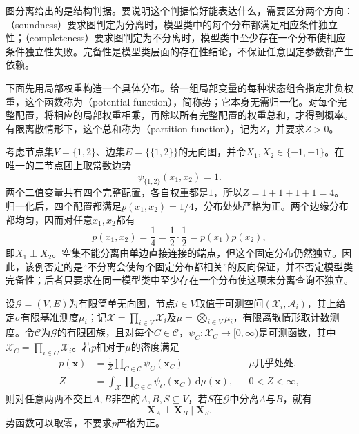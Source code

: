 图分离给出的是结构判据。要说明这个判据恰好能表达什么，需要区分两个方向：（soundness）要求图判定为分离时，模型类中的每个分布都满足相应条件独立性；（completeness）要求图判定为不分离时，模型类中至少存在一个分布使相应条件独立性失败。完备性是模型类层面的存在性结论，不保证任意固定参数都产生依赖。

下面先用局部权重构造一个具体分布。给一组局部变量的每种状态组合指定非负权重，这个函数称为（potential function），简称势；它本身无需归一化。对每个完整配置，将相应的局部权重相乘，再除以所有完整配置的权重总和，才得到概率。有限离散情形下，这个总和称为（partition function），记为$Z$，并要求$Z>0$。

\begin{example}[不分离不强迫固定分布相关]
  \label{ex:pgm-undirected-fixed-distribution-extra-independence}
  考虑节点集$V=\{1,2\}$、边集$E=\{\{1,2\}\}$的无向图，并令$X_1,X_2\in\{-1,+1\}$。在唯一的二节点团上取常数边势
  \[
    \psi_{\{1,2\}}(x_1,x_2)=1.
  \]
  两个二值变量共有四个完整配置，各自权重都是$1$，所以$Z=1+1+1+1=4$。归一化后，四个配置都满足$p(x_1,x_2)=1/4$，分布处处严格为正。两个边缘分布都均匀，因而对任意$x_1,x_2$都有
  \[
    p(x_1,x_2)=\frac14
    =\frac12\cdot\frac12
    =p(x_1)p(x_2),
  \]
  即$X_1\perp X_2$。空集不能分离由单边直接连接的端点，但这个固定分布仍然独立。因此，该例否定的是“不分离会使每个固定分布都相关”的反向保证，并不否定模型类完备性；后者只要求在同一模型类中至少存在一个分布使这项未分离查询不独立。
\end{example}

\begin{theorem}[团因子分解分布上的分离可靠性]
  \label{thm:pgm-undirected-factorization-to-global}
  设$\mathcal{G}=(V,E)$为有限简单无向图，节点$i\in V$取值于可测空间$(\mathcal{X}_i,\mathcal{A}_i)$，其上给定$\sigma$有限基准测度$\mu_i$；记$\mathcal{X}=\prod_{i\in V}\mathcal{X}_i$及$\mu=\bigotimes_{i\in V}\mu_i$，有限离散情形取计数测度。令$\mathcal{C}$为$\mathcal{G}$的有限团族，且对每个$C\in\mathcal{C}$，$\psi_C:\mathcal{X}_C\to[0,\infty)$是可测函数，其中$\mathcal{X}_C=\prod_{i\in C}\mathcal{X}_i$。若$p$相对于$\mu$的密度满足
  \[
    \begin{aligned}
      p(\bm{x})
      &=\frac{1}{Z}\prod_{C\in\mathcal{C}}\psi_C(\bm{x}_C)
        &&\text{$\mu$几乎处处},\\
      Z
      &=\int_{\mathcal{X}}\prod_{C\in\mathcal{C}}
        \psi_C(\bm{x}_C)\,\mathrm{d}\mu(\bm{x}),
        &&0<Z<\infty,
    \end{aligned}
  \]
  则对任意两两不交且$A,B$非空的$A,B,S\subseteq V$，若$S$在$\mathcal{G}$中分离$A$与$B$，就有
  \[
    \bm{X}_A\perp\bm{X}_B\mid\bm{X}_S.
  \]
  势函数可以取零，不要求$p$严格为正。
\end{theorem}

